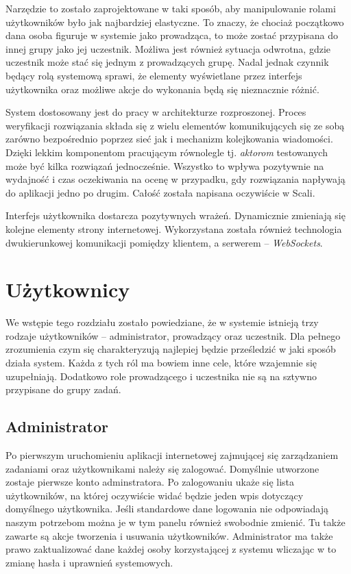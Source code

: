 \documentclass[brudnopis]{xmgr}
\begin{document}
Narzędzie to zostało zaprojektowane w taki sposób, aby manipulowanie rolami użytkowników było jak najbardziej elastyczne. To znaczy, że chociaż początkowo dana osoba figuruje w systemie jako prowadząca, to może zostać przypisana do innej grupy jako jej uczestnik. Możliwa jest również sytuacja odwrotna, gdzie uczestnik może stać się jednym z prowadzących grupę. Nadal jednak czynnik będący rolą systemową sprawi, że elementy wyświetlane przez interfejs użytkownika oraz możliwe akcje do wykonania będą się nieznacznie różnić.

System dostosowany jest do pracy w architekturze rozproszonej. Proces weryfikacji rozwiązania składa się z wielu elementów komunikujących się ze sobą zarówno bezpośrednio poprzez sieć jak i mechanizm kolejkowania wiadomości. Dzięki lekkim komponentom pracującym równolegle tj. \emph{aktorom} testowanych może być kilka rozwiązań jednocześnie. Wszystko to wpływa pozytywnie na wydajność i czas oczekiwania na ocenę w przypadku, gdy rozwiązania napływają do aplikacji jedno po drugim. Całość została napisana oczywiście w Scali. 
 
Interfejs użytkownika dostarcza pozytywnych wrażeń. Dynamicznie zmieniają się kolejne elementy strony internetowej. Wykorzystana została również technologia dwukierunkowej komunikacji pomiędzy klientem, a serwerem -- \emph{WebSockets}. 

\section{Użytkownicy}

We wstępie tego rozdziału zostało powiedziane, że w systemie istnieją trzy rodzaje użytkowników -- administrator, prowadzący oraz uczestnik. Dla pełnego zrozumienia czym się charakteryzują najlepiej będzie prześledzić w jaki sposób działa system. Każda z tych ról ma bowiem inne cele, które wzajemnie się uzupełniają. Dodatkowo role prowadzącego i uczestnika nie są na sztywno przypisane do grupy zadań. 

\subsection{Administrator}

Po pierwszym uruchomieniu aplikacji internetowej zajmującej się zarządzaniem zadaniami oraz użytkownikami należy się zalogować. Domyślnie utworzone zostaje pierwsze konto adminstratora. Po zalogowaniu ukaże się lista użytkowników, na której oczywiście widać będzie jeden wpis dotyczący domyślnego użytkownika. Jeśli standardowe dane logowania nie odpowiadają naszym potrzebom można je w tym panelu również swobodnie zmienić. Tu także zawarte są akcje tworzenia i usuwania użytkowników. Administrator ma także prawo zaktualizować dane każdej osoby korzystającej z systemu wliczając w to zmianę hasła i uprawnień systemowych.
\end{document}

